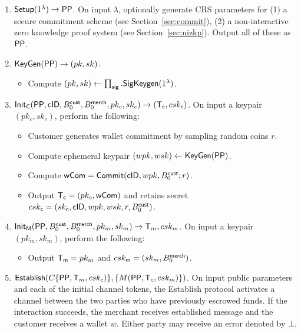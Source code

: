 \documentclass[11pt]{report}
\newcommand{\BC}{B^{\text{\sf cust}}_{\text{0}}}
\newcommand{\BM}{B^{\text{\sf merch}}_{\text{0}}}
\begin{document}
\begin{enumerate}

\item ${\sf Setup}(1^\lambda) \rightarrow {\sf PP}$. On input $\lambda$, optionally generate CRS parameters for (1) a secure commitment scheme (see Section~\ref{sec:commit}), (2) a non-interactive zero knowledge proof system (see Section~\ref{sec:nizkp}). Output all of these as ${\sf PP}$.

\item ${\sf KeyGen}({\sf PP}) \rightarrow (pk, sk)$. 
\begin{itemize}
\item Compute $(pk, sk) \leftarrow \prod_{\sf sig}.{\sf SigKeygen}(1^\lambda)$. %
\end{itemize}

\medskip \noindent
\item ${\sf Init_{C}}({\sf PP}, {\sf cID}, \BC, \BM, pk_c, sk_c) \rightarrow ({\sf T}_{\sf c}, csk_{\sf c})$. On input a keypair $(pk_c, sk_c)$, perform the following:

\begin{itemize} 
\item Customer generates wallet commitment by sampling random coins $r$.
\item Compute ephemeral keypair $(wpk, wsk) \leftarrow {\sf KeyGen}({\sf PP})$.
\item Compute ${\sf wCom} = {\sf Commit}({\sf cID}, wpk, \BC; r)$.
\item Output ${\sf T}_{\sf c} = (pk_c, {\sf wCom})$ and retains secret $csk_{\sf c} = (sk_c, {\sf cID}, wpk, wsk, r, \BC)$.
\end{itemize}

\item ${\sf Init_{M}}({\sf PP}, \BC, \BM, pk_m, sk_m) \rightarrow {\sf T}_m, csk_m$. On input a keypair $(pk_m, sk_m)$, perform the following:

\begin{itemize} 
\item Output ${\sf T}_{\sf m} = pk_m$ and $csk_{\sf m} = (sk_m, \BM)$.
\end{itemize}

\item ${\sf Establish}( C\{{\sf PP}, {\sf T}_m, csk_c)\}, \{M({\sf PP}, {\sf T}_c, csk_{m})\})$. On input public parameters and each of the initial
channel tokens, the {\sf Establish} protocol activates a channel between the two parties who have previously
escrowed funds. If the interaction succeeds, the merchant receives {\sf established} message and the customer
receives a wallet $w$. Either party may receive an error denoted by $\bot$.


\end{enumerate}
\end{document}

